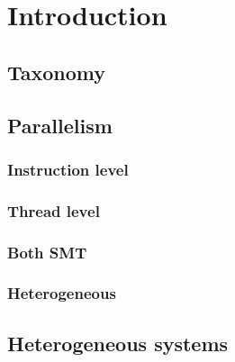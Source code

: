 \documentclass[11pt]{article}
\begin{document}
    \section{Introduction}\label{sec:introduction}


    \subsection{Taxonomy}\label{subsec:taxonomy}

    \subsection{Parallelism}\label{subsec:parallelism}

    \subsubsection{Instruction level}
    \subsubsection{Thread level}
    \subsubsection{Both SMT}
    \subsubsection{Heterogeneous}


    \subsection{Heterogeneous systems}\label{subsec:heterogeneous-systems}
\end{document}
